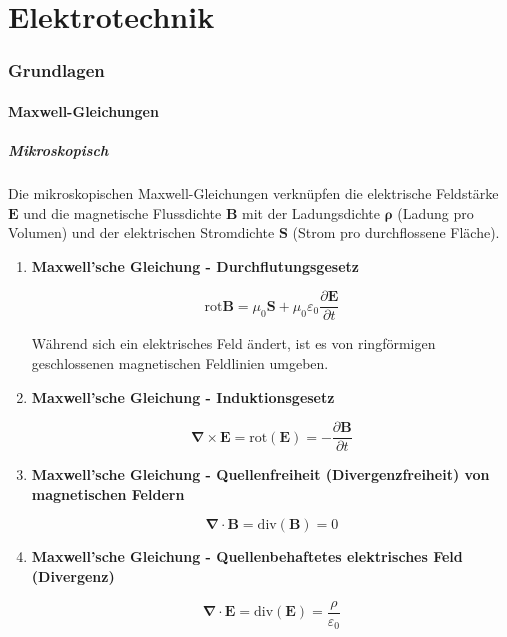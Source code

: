 \part{Elektrotechnik}
	\section{Grundlagen}
		\subsection{Maxwell-Gleichungen}
			\subsubsection{Mikroskopisch}
				Die mikroskopischen Maxwell-Gleichungen verknüpfen die elektrische Feldstärke $ \bm{E} $ und die magnetische Flussdichte $ \bm{B} $ mit der Ladungsdichte $ \bm{\rho} $  (Ladung pro Volumen) und der elektrischen Stromdichte $ \bm{S} $ (Strom pro durchflossene Fläche).
				\begin{enumerate}
					\item \textbf{Maxwell'sche Gleichung - Durchflutungsgesetz}
					\begin{tcolorbox}[leftrule=3mm]
						 \begin{equation}
						 \text{rot} \bm{B} = \mu_{0}\bm{S} +  \mu_{0}\varepsilon_{0}\frac{\partial\bm{E}}{\partial t}
						 \end{equation}	
					\end{tcolorbox}
					Während sich ein elektrisches Feld ändert, ist es von ringförmigen geschlossenen magnetischen Feldlinien umgeben.
						 
					\item \textbf{Maxwell'sche Gleichung - Induktionsgesetz}
					\begin{tcolorbox}[leftrule=3mm]
						\begin{equation}
							\bm{\nabla} \times \bm{E}=\text{rot}(\bm{E})=-\frac{\partial \bm{B}}{\partial t}
						\end{equation}
					\end{tcolorbox}
	
					\item \textbf{Maxwell'sche Gleichung - Quellenfreiheit (Divergenzfreiheit) von magnetischen Feldern}
					\begin{tcolorbox}[leftrule=3mm]
						\begin{equation}
						\bm{\nabla \cdot B} = \text{div}(\bm{B}) = 0
						\end{equation}
					\end{tcolorbox}
					
					\item \textbf{Maxwell'sche Gleichung - Quellenbehaftetes elektrisches Feld (Divergenz)}
					\begin{tcolorbox}[leftrule=3mm]
						\begin{equation}
						\bm{\nabla \cdot E} = \text{div}(\bm{E}) = \frac{\rho}{\varepsilon_{0}}
						\end{equation}
					\end{tcolorbox}
				\end{enumerate}
